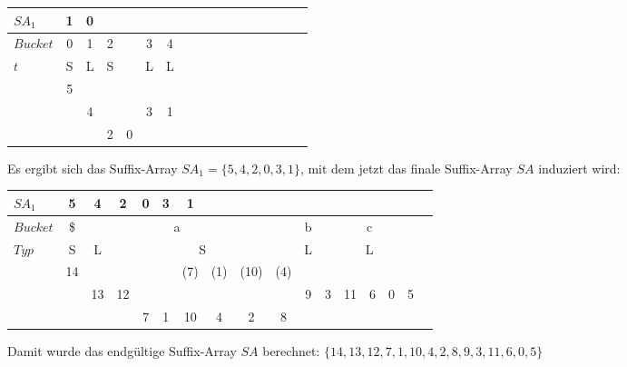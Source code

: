 \begin{center}
  \begin{tabular}{ | l | c | c | c | c | c | c | c | c | c | c | c | c | c | c | c | c | }
    \hline
     $SA_1$ & 1 & 0 & & & & \\ \hline
   $Bucket$ & 0 & 1 & \multicolumn{1}{c}{2} & & 3 & 4 \\ \hline
      $t$   & S & L & \multicolumn{1}{c}{S} & & L & L \\ \hline
            & 5 & & & & &  \\ \hline
            & & 4 & & & 3 & 1 \\ \hline
            & & & 2 & 0 & & \\
    \hline
  \end{tabular}
\end{center}
\bigskip

\noindent Es ergibt sich das Suffix-Array $SA_1 = \{5, 4, 2, 0, 3, 1\}$, mit dem jetzt das finale Suffix-Array $SA$ induziert wird:

\begin{center}
  \begin{tabular}{ | l | c | c | c | c | c | c | c | c | c | c | c | c | c | c | c | c | }
    \hline
     $SA_1$ & 5 & 4 & 2 & 0 & 3 & 1 & & & & & & & & & \\ \hline
   $Bucket$ &\$ & \multicolumn{7}{c}{a} &   & \multicolumn{1}{c}{b} &   & \multicolumn{3}{c}{c} & \\ \hline
      $Typ$ & S & \multicolumn{1}{c}{L} &   & \multicolumn{5}{c}{S} &   & \multicolumn{1}{c}{L} &    & \multicolumn{3}{c}{L} &\\ \hline
            & 14 & & & & & (7) & (1) & (10) & (4) & & & & & & \\ \hline
            & & 13 & 12 & & & & & & & 9 & 3 & 11 & 6 & 0 & 5 \\ \hline
            & & & & 7 & 1 & 10 & 4 & 2 & 8 & & & & & & \\
    \hline
  \end{tabular}
\end{center}
\bigskip
Damit wurde das endgültige Suffix-Array $SA$ berechnet: $\{14, 13, 12, 7, 1, 10, 4, 2, 8, 9, 3, 11, 6, 0, 5\}$

